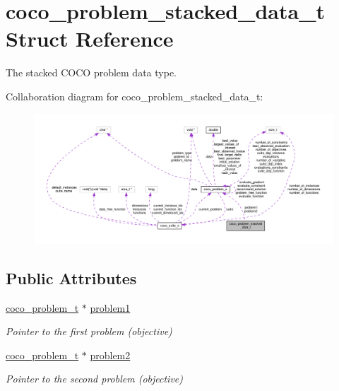 \hypertarget{structcoco__problem__stacked__data__t}{}\section{coco\+\_\+problem\+\_\+stacked\+\_\+data\+\_\+t Struct Reference}
\label{structcoco__problem__stacked__data__t}


The stacked C\+O\+CO problem data type.  




Collaboration diagram for coco\+\_\+problem\+\_\+stacked\+\_\+data\+\_\+t\+:\nopagebreak
\begin{figure}[H]
\begin{center}
\leavevmode
\includegraphics[width=350pt]{structcoco__problem__stacked__data__t__coll__graph}
\end{center}
\end{figure}
\subsection*{Public Attributes}
\begin{DoxyCompactItemize}
\item 
\hyperlink{structcoco__problem__s}{coco\+\_\+problem\+\_\+t} $\ast$ \hyperlink{structcoco__problem__stacked__data__t_ac60250e4251d100b2475ecd3b8704616}{problem1}\hypertarget{structcoco__problem__stacked__data__t_ac60250e4251d100b2475ecd3b8704616}{}\label{structcoco__problem__stacked__data__t_ac60250e4251d100b2475ecd3b8704616}

\begin{DoxyCompactList}\small\item\em Pointer to the first problem (objective) \end{DoxyCompactList}\item 
\hyperlink{structcoco__problem__s}{coco\+\_\+problem\+\_\+t} $\ast$ \hyperlink{structcoco__problem__stacked__data__t_a1411268e705dcdb043e23a4e22d39144}{problem2}\hypertarget{structcoco__problem__stacked__data__t_a1411268e705dcdb043e23a4e22d39144}{}\label{structcoco__problem__stacked__data__t_a1411268e705dcdb043e23a4e22d39144}

\begin{DoxyCompactList}\small\item\em Pointer to the second problem (objective) \end{DoxyCompactList}\end{DoxyCompactItemize}


